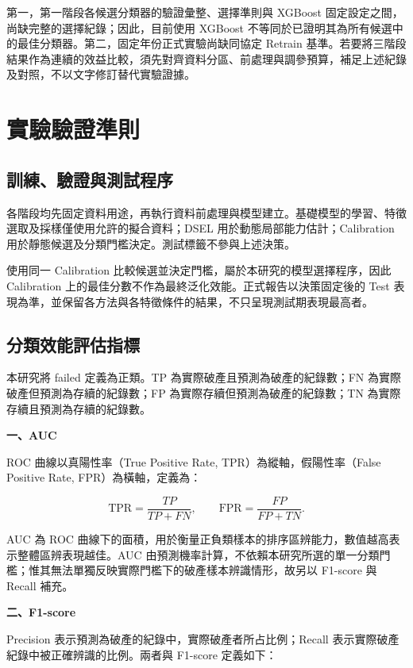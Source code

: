 第一，第一階段各候選分類器的驗證彙整、選擇準則與 XGBoost 固定設定之間，尚缺完整的選擇紀錄；因此，目前使用 XGBoost 不等同於已證明其為所有候選中的最佳分類器。第二，固定年份正式實驗尚缺同協定 Retrain 基準。若要將三階段結果作為連續的效益比較，須先對齊資料分區、前處理與調參預算，補足上述紀錄及對照，不以文字修訂替代實驗證據。

\section{實驗驗證準則}\label{sec:method-validation}

\subsection{訓練、驗證與測試程序}

各階段均先固定資料用途，再執行資料前處理與模型建立。基礎模型的學習、特徵選取及採樣僅使用允許的擬合資料；DSEL 用於動態局部能力估計；Calibration 用於靜態候選及分類門檻決定。測試標籤不參與上述決策。

使用同一 Calibration 比較候選並決定門檻，屬於本研究的模型選擇程序，因此 Calibration 上的最佳分數不作為最終泛化效能。正式報告以決策固定後的 Test 表現為準，並保留各方法與各特徵條件的結果，不只呈現測試期表現最高者。

\subsection{分類效能評估指標}

本研究將 failed 定義為正類。TP 為實際破產且預測為破產的紀錄數；FN 為實際破產但預測為存續的紀錄數；FP 為實際存續但預測為破產的紀錄數；TN 為實際存續且預測為存續的紀錄數。

\textbf{一、AUC}

ROC 曲線以真陽性率（True Positive Rate, TPR）為縱軸，假陽性率（False Positive Rate, FPR）為橫軸，定義為：

\begin{equation}\label{eq:method-roc}
\mathrm{TPR}=\frac{TP}{TP+FN},\qquad
\mathrm{FPR}=\frac{FP}{FP+TN}.
\end{equation}

AUC 為 ROC 曲線下的面積，用於衡量正負類樣本的排序區辨能力，數值越高表示整體區辨表現越佳。AUC 由預測機率計算，不依賴本研究所選的單一分類門檻；惟其無法單獨反映實際門檻下的破產樣本辨識情形，故另以 F1-score 與 Recall 補充。

\textbf{二、F1-score}

Precision 表示預測為破產的紀錄中，實際破產者所占比例；Recall 表示實際破產紀錄中被正確辨識的比例。兩者與 F1-score 定義如下：

